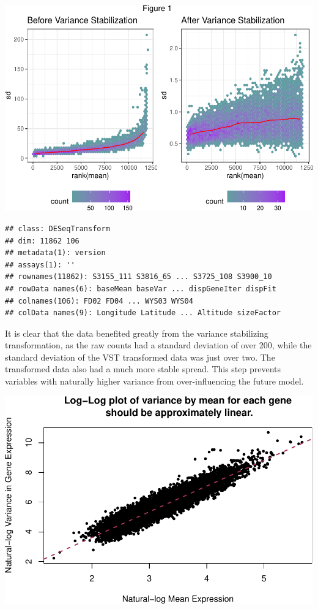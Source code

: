 \documentclass[
]{article}
\begin{document}
\includegraphics{Final-Report_files/figure-latex/unnamed-chunk-4-1.pdf}

\begin{verbatim}
## class: DESeqTransform 
## dim: 11862 106 
## metadata(1): version
## assays(1): ''
## rownames(11862): S3155_111 S3816_65 ... S3725_108 S3900_10
## rowData names(6): baseMean baseVar ... dispGeneIter dispFit
## colnames(106): FD02 FD04 ... WYS03 WYS04
## colData names(9): Longitude Latitude ... Altitude sizeFactor
\end{verbatim}

It is clear that the data benefited greatly from the variance
stabilizing transformation, as the raw counts had a standard deviation
of over 200, while the standard deviation of the VST transformed data
was just over two. The transformed data also had a much more stable
spread. This step prevents variables with naturally higher variance from
over-influencing the future model.

\includegraphics{Final-Report_files/figure-latex/unnamed-chunk-5-1.pdf}
\end{document}
